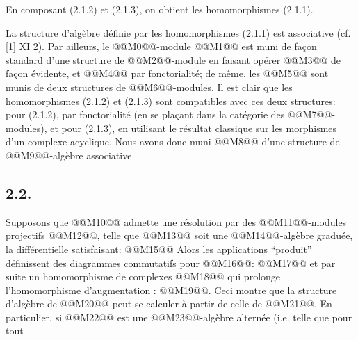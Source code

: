 

En
composant (2.1.2) et (2.1.3), on obtient les homomorphismes (2.1.1).

La structure d'algèbre définie par les homomorphismes (2.1.1) est associative (cf. [1] XI 2). Par ailleurs, le @@M0@@-module @@M1@@ est muni de façon standard d'une structure de @@M2@@-module en faisant opérer @@M3@@ de façon évidente, et @@M4@@ par fonctorialité; de même, les @@M5@@ sont munis de deux structures de @@M6@@-modules. Il est clair que les homomorphismes (2.1.2) et (2.1.3) sont compatibles avec ces deux structures: pour (2.1.2), par fonctorialité (en se plaçant dans la catégorie des @@M7@@-modules), et pour (2.1.3), en utilisant le résultat classique sur les morphismes d'un complexe acyclique. Nous avons donc muni @@M8@@ d'une structure de @@M9@@-algèbre associative.

\subsection*{2.2.}
Supposons que @@M10@@ admette une résolution par des @@M11@@-modules projectifs @@M12@@, telle que @@M13@@ soit une @@M14@@-algèbre graduée, la différentielle satisfaisant:
@@M15@@
Alors les applications ``produit'' définissent des diagrammes commutatifs pour @@M16@@:
@@M17@@
et par suite un homomorphisme de complexes @@M18@@ qui prolonge l'homomorphisme d'augmentation : @@M19@@. Ceci montre que la structure d'algèbre de @@M20@@ peut se calculer à partir de celle de @@M21@@. En particulier, si @@M22@@ est une @@M23@@-algèbre alternée (i.e. telle que pour tout
